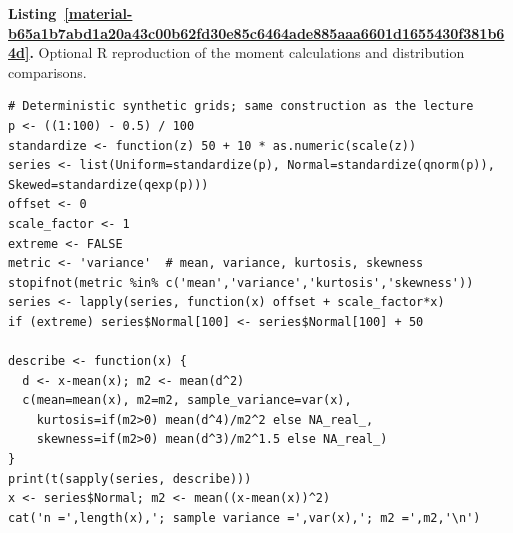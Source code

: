 \documentclass[11pt,a4paper]{article}
\newcounter{listing}
\begin{document}
\par\medskip
{}
\label{material-b65a1b7abd1a20a43c00b62fd30e85c6464ade885aaa6601d1655430f381b64d}
\noindent\textbf{Listing~\ref*{material-b65a1b7abd1a20a43c00b62fd30e85c6464ade885aaa6601d1655430f381b64d}.} Optional R reproduction of the moment calculations and distribution comparisons.\par\nopagebreak
\begin{Verbatim}[fontsize=\footnotesize,breaklines=true,breakanywhere=true]
# Deterministic synthetic grids; same construction as the lecture
p <- ((1:100) - 0.5) / 100
standardize <- function(z) 50 + 10 * as.numeric(scale(z))
series <- list(Uniform=standardize(p), Normal=standardize(qnorm(p)), Skewed=standardize(qexp(p)))
offset <- 0
scale_factor <- 1
extreme <- FALSE
metric <- 'variance'  # mean, variance, kurtosis, skewness
stopifnot(metric %in% c('mean','variance','kurtosis','skewness'))
series <- lapply(series, function(x) offset + scale_factor*x)
if (extreme) series$Normal[100] <- series$Normal[100] + 50

describe <- function(x) {
  d <- x-mean(x); m2 <- mean(d^2)
  c(mean=mean(x), m2=m2, sample_variance=var(x),
    kurtosis=if(m2>0) mean(d^4)/m2^2 else NA_real_,
    skewness=if(m2>0) mean(d^3)/m2^1.5 else NA_real_)
}
print(t(sapply(series, describe)))
x <- series$Normal; m2 <- mean((x-mean(x))^2)
cat('n =',length(x),'; sample variance =',var(x),'; m2 =',m2,'\n')


\end{Verbatim}
\end{document}
